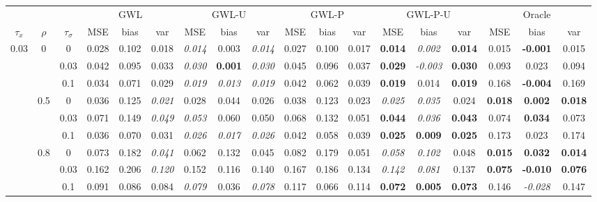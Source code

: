 \documentclass[authoryear, review, 10pt]{elsarticle}
\begin{document}
\begin{sidewaystable}[ht]
\begin{center}
\begin{tabular}{ccc|ccc|ccc|ccc|ccc|ccc}
&&&\multicolumn{3}{c}{GWL}&\multicolumn{3}{c}{GWL-U}&\multicolumn{3}{c}{GWL-P}&\multicolumn{3}{c}{GWL-P-U}&\multicolumn{3}{c}{Oracle}\\
$\tau_x$ & $\rho$ & $\tau_\sigma$ & MSE & bias & var &  MSE & bias & var &  MSE & bias & var &  MSE & bias & var &  MSE & bias & var\\ 
\hline
\multirow{9}{*}{0.03} & \multirow{3}{*}{0} & 0 & 0.028 & 0.102 & 0.018 & \emph{0.014} & 0.003 & \emph{0.014} & 0.027 & 0.100 & 0.017 & \textbf{0.014} & \emph{0.002} & \textbf{0.014} & 0.015 & \textbf{-0.001} & 0.015 \\ 
 &  & 0.03 &   0.042 & 0.095 & 0.033 & \emph{0.030} & \textbf{0.001} & \emph{0.030} & 0.045 & 0.096 & 0.037 & \textbf{0.029} & \emph{-0.003} & \textbf{0.030} & 0.093 & 0.023 & 0.094 \\ 
 &  & 0.1 &   0.034 & 0.071 & 0.029 & \emph{0.019} & \emph{0.013} & \emph{0.019} & 0.042 & 0.062 & 0.039 & \textbf{0.019} & 0.014 & \textbf{0.019} & 0.168 & \textbf{-0.004} & 0.169 \\ \cline{2-18}
 & \multirow{3}{*}{0.5} & 0 &   0.036 & 0.125 & \emph{0.021} & 0.028 & 0.044 & 0.026 & 0.038 & 0.123 & 0.023 & \emph{0.025} & \emph{0.035} & 0.024 & \textbf{0.018} & \textbf{0.002} & \textbf{0.018} \\ 
 &  & 0.03 &   0.071 & 0.149 & \emph{0.049} & \emph{0.053} & 0.060 & 0.050 & 0.068 & 0.132 & 0.051 & \textbf{0.044} & \emph{0.036} & \textbf{0.043} & 0.074 & \textbf{0.034} & 0.073 \\ 
 &  & 0.1 &   0.036 & 0.070 & 0.031 & \emph{0.026} & \emph{0.017} & \emph{0.026} & 0.042 & 0.058 & 0.039 & \textbf{0.025} & \textbf{0.009} & \textbf{0.025} & 0.173 & 0.023 & 0.174 \\ \cline{2-18}
 & \multirow{3}{*}{0.8} & 0 &   0.073 & 0.182 & \emph{0.041} & 0.062 & 0.132 & 0.045 & 0.082 & 0.179 & 0.051 & \emph{0.058} & \emph{0.102} & 0.048 & \textbf{0.015} & \textbf{0.032} & \textbf{0.014} \\ 
 &  & 0.03 &   0.162 & 0.206 & \emph{0.120} & 0.152 & 0.116 & 0.140 & 0.167 & 0.186 & 0.134 & \emph{0.142} & \emph{0.081} & 0.137 & \textbf{0.075} & \textbf{-0.010} & \textbf{0.076} \\ 
 &  & 0.1 &   0.091 & 0.086 & 0.084 & \emph{0.079} & 0.036 & \emph{0.078} & 0.117 & 0.066 & 0.114 & \textbf{0.072} & \textbf{0.005} & \textbf{0.073} & 0.146 & \emph{-0.028} & 0.147 \\ \cline{1-18}

\end{tabular}
\end{center}
\end{sidewaystable}
\end{document}
